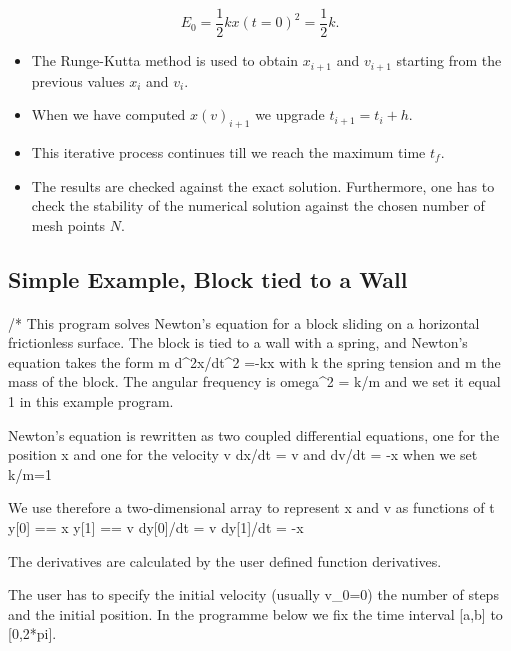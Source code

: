 \documentclass[%
oneside,                 %
final,                   %
10pt]{article}
\begin{document}
\noindent
  \[
    E_0=\frac{1}{2}kx(t=0)^2=\frac{1}{2}k.
  \]
\begin{itemize}
 \item The Runge-Kutta method is used to obtain $x_{i+1}$ and $v_{i+1}$ starting from the previous values $x_i$ and $v_i$.

 \item When we have computed $x(v)_{i+1}$ we upgrade  $t_{i+1}=t_i+h$.

 \item This iterative  process continues till we reach the maximum time $t_f$.

 \item The results are checked against the exact solution. Furthermore, one has to check the stability of the numerical solution against the chosen number of mesh points $N$.      
\end{itemize}

\noindent



\subsection{Simple Example, Block tied to a Wall}

\paragraph{}
\bpypro
/*    This program solves Newton's equation for a block
      sliding on a horizontal frictionless surface. The block
      is tied  to a wall with a spring, and Newton's equation
      takes the form
           m d^2x/dt^2 =-kx
      with k the spring tension and m the mass of the block.
      The angular frequency is omega^2 = k/m and we set it equal
      1 in this example program. 

      Newton's equation is rewritten as two coupled differential
      equations, one for the position x  and one for the velocity v
           dx/dt = v    and
           dv/dt = -x   when we set k/m=1

      We use therefore a two-dimensional array to represent x and v
      as functions of t
      y[0] == x
      y[1] == v
      dy[0]/dt = v
      dy[1]/dt = -x

      The derivatives are calculated by the user defined function 
      derivatives.

      The user has to specify the initial velocity (usually v_0=0)
      the number of steps and the initial position. In the programme
      below we fix the time interval [a,b] to [0,2*pi].
\end{document}
